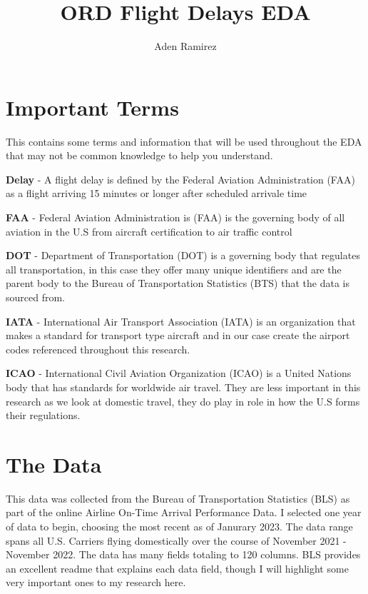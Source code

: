 \documentclass[a4paper,11pt]{article}
\begin{document}
\title{ORD Flight Delays EDA}
\author{Aden Ramirez}
\maketitle


\section{Important Terms}
This contains some terms and information that will be used throughout the EDA that may not be common knowledge to help you understand. 

\textbf{Delay} - A flight delay is defined by the Federal Aviation Administration (FAA) as a flight arriving 15 minutes or longer after scheduled arrivale time

\textbf{FAA} - Federal Aviation Administration is (FAA) is the governing body of all aviation in the U.S from aircraft certification to air traffic control

\textbf{DOT} - Department of Transportation (DOT) is a governing body that regulates all transportation, in this case they offer many unique identifiers 
and are the parent body to the Bureau of Transportation Statistics (BTS) that the data is sourced from.

\textbf{IATA} - International Air Transport Association (IATA) is an organization that makes a standard for transport type aircraft and in our case create the airport codes referenced
throughout this research. 

\textbf{ICAO} - International Civil Aviation Organization (ICAO) is a United Nations body that has standards for worldwide air travel. They are less important in this research as we look at domestic travel,
they do play in role in how the U.S forms their regulations.

\section{The Data} \label{data}
This data was collected from the Bureau of Transportation Statistics (BLS) as part of the online Airline On-Time Arrival Performance Data. 
I selected one year of data to begin, choosing the most recent as of Janurary 2023. The data range spans all U.S. Carriers flying domestically over the course of November 2021 - November 2022.
The data has many fields totaling to 120 columns. BLS provides an excellent readme that explains each data field, though I will highlight some very important ones to my research here.
\end{document}
